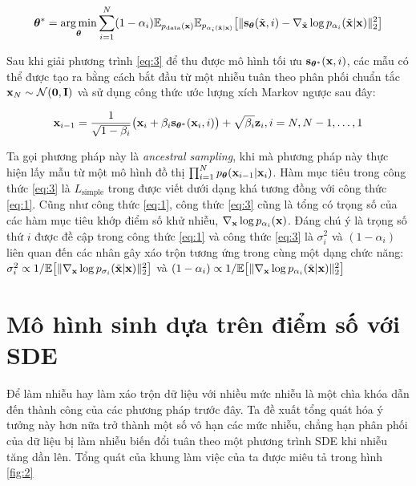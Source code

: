 \documentclass{article} %
\begin{document}
\begin{equation} \label{eq:3}
    \boldsymbol{\theta}^{\ast} = \operatorname*{arg\,min}_{\boldsymbol{\theta}} \sum_{i=1}^N (1 - \alpha_i) \mathbb{E}_{p_{\mathrm{data}}(\bold{x})} \mathbb{E}_{p_{\alpha_i (\tilde{\bold{x}} \vert \bold{x})}} \big \lbrack \lVert \bold{s}_{\boldsymbol{\theta}} (\tilde{\bold{x}}, i) - \nabla_{\tilde{\bold{x}}} \log p_{\alpha_i} (\tilde{\bold{x}} \vert \bold{x}) \rVert_2^2 \big \rbrack
\end{equation}

Sau khi giải phương trình \ref{eq:3} để thu được mô hình tối ưu $\bold{s}_{\boldsymbol{\theta}^{\ast}}(\bold{x}, i)$, các mẫu có thể được tạo ra bằng cách bắt đầu từ một nhiễu tuân theo phân phối chuẩn tắc $\bold{x}_N \sim \mathcal{N}(\bold{0}, \bold{I})$ và sử dụng công thức ước lượng xích Markov ngược sau đây:

\begin{equation} \label{eq:4}
    \bold{x}_{i-1} = \dfrac{1}{\sqrt{1-\beta_i}} \big( \bold{x}_i + \beta_i \bold{s}_{\boldsymbol{\theta}^{\ast}} (\bold{x}_i, i) \big) + \sqrt{\beta_i} \bold{z}_i, i = N, N-1, \dots, 1
\end{equation}

Ta gọi phương pháp này là \textit{ancestral sampling}, khi mà phương pháp này thực hiện lấy mẫu từ một mô hình đồ thị $\prod_{i=1}^N p_{\boldsymbol{\theta}} (\bold{x}_{i-1} \vert \bold{x}_i)$.
Hàm mục tiêu trong công thức \ref{eq:3} là $L_{\mathrm{simple}}$ trong \citep{ho2020denoising} được viết dưới dạng khá tương đồng với công thức \ref{eq:1}.
Cũng như công thức \ref{eq:1}, công thức \ref{eq:3} cũng là tổng có trọng số của các hàm mục tiêu khớp điểm số khử nhiễu, $\nabla_{\bold{x}}\log p_{\alpha_i}(\bold{x})$.
Đáng chú ý là trọng số thứ $i$ được đề cập trong công thức \ref{eq:1} và công thức \ref{eq:3} là $\sigma_i^2$ và $(1-\alpha_i)$ liên quan đến các nhân gây xáo trộn tương ứng trong cùng một dạng chức năng:
$\sigma_i^2 \propto 1/\mathbb{E} \big \lbrack \lVert \nabla_{\bold{x}} \log p_{\sigma_i} (\tilde{\bold{x}} \vert \bold{x}) \rVert_2^2 \big \rbrack$ và $(1-\alpha_i) \propto 1/\mathbb{E} \big \lbrack \lVert \nabla_\bold{x} \log p_{\alpha_i}  (\tilde{\bold{x}} \vert \bold{x})\rVert_2^2 \big \rbrack$

\section{Mô hình sinh dựa trên điểm số với SDE}

Để làm nhiễu hay làm xáo trộn dữ liệu với nhiều mức nhiễu là một chìa khóa dẫn đến thành công của các phương pháp trước đây.
Ta đề xuất tổng quát hóa ý tưởng này hơn nữa trở thành một số vô hạn các mức nhiễu, chẳng hạn phân phối của dữ liệu bị làm nhiễu biến đổi tuân theo một phương trình SDE khi nhiễu tăng dần lên.
Tổng quát của khung làm việc của ta được miêu tả trong hình \ref{fig:2}
\end{document}
